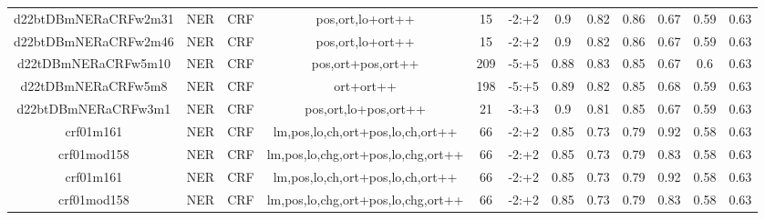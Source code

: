 \documentclass[a4paper]{article}
\begin{document}
\begin{landscape}
\begin{center}
\begin{tabular}{ |c|c|c|c|c|c|c|c|c|c|c|c|}
 	
 		
 		\small{ d22btDBmNERaCRFw2m31 } & NER & CRF & pos,ort,lo+ort++  &  15 &  -2:+2  &  0.9 & 0.82 & 0.86  &  0.67 & 0.59 & 0.63 \\
 		

 	
 
 	
 		
 		\small{ d22btDBmNERaCRFw2m46 } & NER & CRF & pos,ort,lo+ort++  &  15 &  -2:+2  &  0.9 & 0.82 & 0.86  &  0.67 & 0.59 & 0.63 \\
 		

 	
 
 	
 		
 		\small{ d22tDBmNERaCRFw5m10 } & NER & CRF & pos,ort+pos,ort++  &  209 &  -5:+5  &  0.88 & 0.83 & 0.85  &  0.67 & 0.6 & 0.63 \\
 		

 	
 
 	
 		
 		\small{ d22tDBmNERaCRFw5m8 } & NER & CRF & ort+ort++  &  198 &  -5:+5  &  0.89 & 0.82 & 0.85  &  0.68 & 0.59 & 0.63 \\
 		

 	
 
 	
 		
 		\small{ d22btDBmNERaCRFw3m1 } & NER & CRF & pos,ort,lo+pos,ort++  &  21 &  -3:+3  &  0.9 & 0.81 & 0.85  &  0.67 & 0.59 & 0.63 \\
 		

 	
 
 	
 		
 		\small{ crf01m161 } & NER & CRF & lm,pos,lo,ch,ort+pos,lo,ch,ort++  &  66 &  -2:+2  &  0.85 & 0.73 & 0.79  &  0.92 & 0.58 & 0.63 \\
 		

 	
 
 	
 		
 		\small{ crf01mod158 } & NER & CRF & lm,pos,lo,chg,ort+pos,lo,chg,ort++  &  66 &  -2:+2  &  0.85 & 0.73 & 0.79  &  0.83 & 0.58 & 0.63 \\
 		

 	
 
 	
 		
 		\small{ crf01m161 } & NER & CRF & lm,pos,lo,ch,ort+pos,lo,ch,ort++  &  66 &  -2:+2  &  0.85 & 0.73 & 0.79  &  0.92 & 0.58 & 0.63 \\
 		

 	
 
 	
 		
 		\small{ crf01mod158 } & NER & CRF & lm,pos,lo,chg,ort+pos,lo,chg,ort++  &  66 &  -2:+2  &  0.85 & 0.73 & 0.79  &  0.83 & 0.58 & 0.63 \\
 		


\end{tabular}
\end{center}
\end{landscape}
\end{document}

